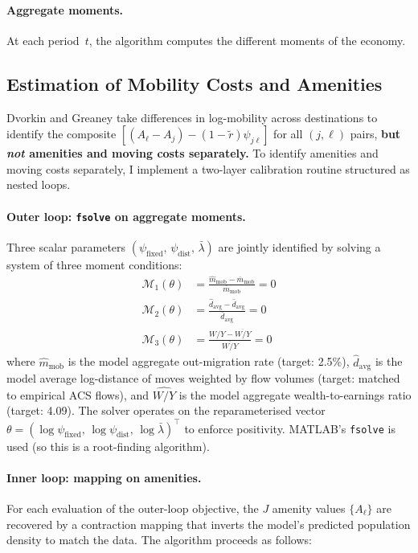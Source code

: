 \documentclass[12pt, a4paper]{article}
\begin{document}
\paragraph{Aggregate moments.} At each period~$t$, the algorithm computes the different moments of the economy.

\subsection{Estimation of Mobility Costs and Amenities}
\label{sec:mobility}


Dvorkin and Greaney take differences in log-mobility across destinations to identify the composite $[(A_\ell - A_j) - (1-\tilde r)\psi_{j\ell}]$ for all $(j, \ell)$ pairs, \textbf{but \emph{not} amenities and moving costs separately.} To identify amenities and moving costs separately, I implement a two-layer calibration routine structured as nested loops.


\paragraph{Outer loop: \texttt{fsolve} on aggregate moments.}Three scalar parameters $(\psi_{\text{fixed}},\, \psi_{\text{dist}},\, \bar\lambda)$ are jointly identified by solving a system of three moment conditions:
\begin{align}
  \mathcal{M}_1(\theta) &= \frac{\hat m_{\text{mob}} - \bar m_{\text{mob}}}{\bar m_{\text{mob}}} = 0 \label{eq:m1}\\
  \mathcal{M}_2(\theta) &= \frac{\hat d_{\text{avg}} - \bar d_{\text{avg}}}{\bar d_{\text{avg}}} = 0 \label{eq:m2}\\
  \mathcal{M}_3(\theta) &= \frac{\widehat{W/Y} - \overline{W/Y}}{\overline{W/Y}} = 0 \label{eq:m3}
\end{align}
where $\hat m_{\text{mob}}$ is the model aggregate out-migration rate (target: 2.5\%), $\hat d_{\text{avg}}$ is the model average log-distance of moves weighted by flow volumes (target: matched to empirical ACS flows), and $\widehat{W/Y}$ is the model aggregate wealth-to-earnings ratio (target: 4.09). The solver operates on the reparameterised vector $\theta = (\log\psi_{\text{fixed}},\, \log\psi_{\text{dist}},\, \log\bar\lambda)^{\top}$ to enforce positivity. MATLAB's \texttt{fsolve} is used (so this is a root-finding algorithm).

\paragraph{Inner loop: mapping on amenities.} For each evaluation of the outer-loop objective, the $J$ amenity values $\{A_\ell\}$ are recovered by a contraction mapping that inverts the model's predicted population density to match the data. The algorithm proceeds as follows:
\end{document}
